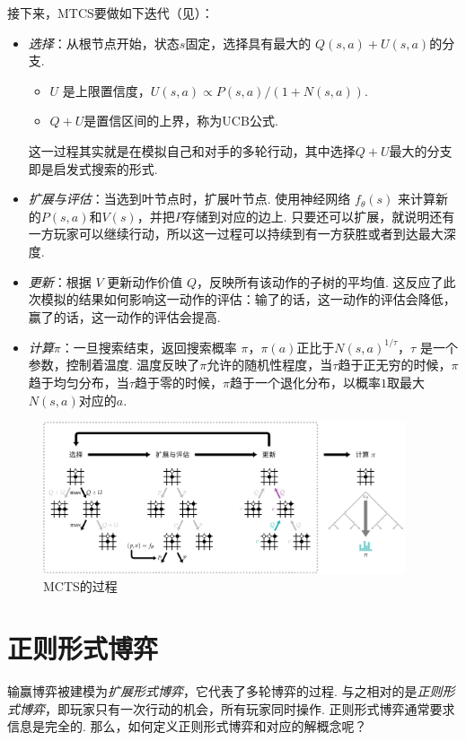 接下来，MTCS要做如下迭代（见）：
\begin{itemize}
  \item \textit{选择}：从根节点开始，状态$s$固定，选择具有最大的 $Q(s,a) + U(s,a)$的分支. 
  \begin{itemize}
    \item $U$ 是上限置信度，$U(s,a)\propto{P(s,a)}/(1+N(s,a))$.
    \item $Q+U$是置信区间的上界，称为UCB公式. 
  \end{itemize}
  这一过程其实就是在模拟自己和对手的多轮行动，其中选择$Q+U$最大的分支即是启发式搜索的形式. 

  \item \textit{扩展与评估}：当选到叶节点时，扩展叶节点. 使用神经网络 $f_\theta(s)$ 来计算新的$P(s,a)$和$V(s)$，并把$P$存储到对应的边上. 只要还可以扩展，就说明还有一方玩家可以继续行动，所以这一过程可以持续到有一方获胜或者到达最大深度.

  \item \textit{更新}：根据 $V$ 更新动作价值 $Q$，反映所有该动作的子树的平均值. 这反应了此次模拟的结果如何影响这一动作的评估：输了的话，这一动作的评估会降低，赢了的话，这一动作的评估会提高.

  \item \textit{计算$\pi$}：一旦搜索结束，返回搜索概率 $\pi$，$\pi(a)$正比于$N(s,a)^{1/\tau}$，$\tau$ 是一个参数，控制着温度. 温度反映了$\pi$允许的随机性程度，当$\tau$趋于正无穷的时候，$\pi$趋于均匀分布，当$\tau$趋于零的时候，$\pi$趋于一个退化分布，以概率$1$取最大$N(s,a)$对应的$a$.
\end{itemize}

\begin{figure}[ht]
\centering
\includegraphics[width=0.95\textwidth]{figures/game/mcts.pdf}
    \caption{MCTS的过程}
    \label{fig:mcts}
\end{figure}


\section{正则形式博弈}
输赢博弈被建模为\textit{扩展形式博弈}，它代表了多轮博弈的过程. 与之相对的是\textit{正则形式博弈}，即玩家只有一次行动的机会，所有玩家同时操作. 正则形式博弈通常要求信息是完全的. 那么，如何定义正则形式博弈和对应的解概念呢？

